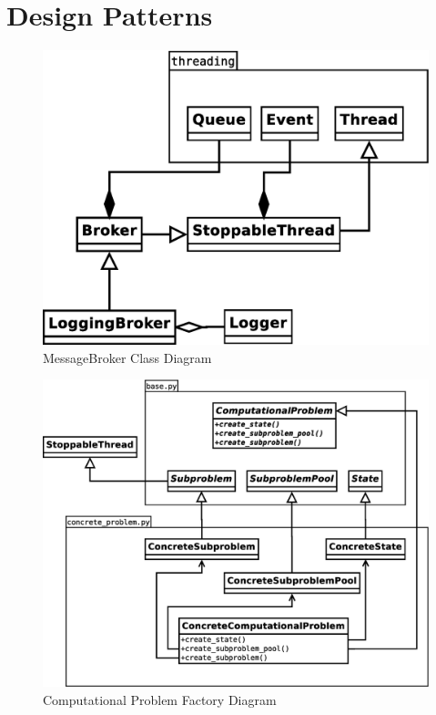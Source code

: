 \documentclass{article}
\begin{document}
\section{Design Patterns}
\begin{figure}[H]
	\centering
	\includegraphics[width=\linewidth]{diagrams/BrokerDiagram.eps}
	\caption{MessageBroker Class Diagram}
\end{figure}

\begin{figure}[H]
	\centering
	\includegraphics[width=\linewidth]{diagrams/FactoryDiagram.eps}
	\caption{Computational Problem Factory Diagram}
\end{figure}
\end{document}
